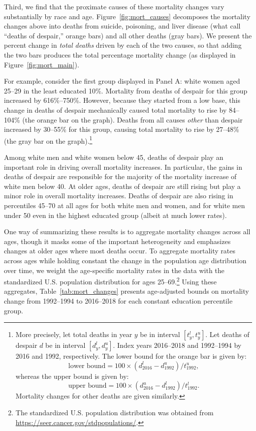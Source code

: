 \documentclass[12pt,letterpaper]{article}
\numberwithin{equation}{section}
\begin{document}
Third, we find that the proximate causes of these mortality changes vary substantially by race and age. Figure~\ref{fig:mort_causes} decomposes the mortality changes above into deaths from suicide, poisoning, and liver disease (what \citet{Case2017} call ``deaths of despair,'' orange bars) and all other deaths (gray bars). We present the percent change in \textit{total deaths} driven by each of the two causes, so that adding the two bars produces the total percentage mortality change (as displayed in Figure~\ref{fig:mort_main}).

For example, consider the first group displayed in Panel A: white women aged 25--29 in the least educated 10\%. Mortality from deaths of despair for this group increased by 616\%--750\%. However, because they started from a low base, this change in deaths of despair mechanically caused total mortality to rise by 84--104\% (the orange bar on the graph). Deaths from all causes \textit{other} than despair increased by 30--55\% for this group, causing total mortality to rise by 27--48\% (the gray bar on the graph).\footnote{More precisely, let total deaths in year $y$ be in interval $[t^l_y, t^u_y]$. Let deaths of despair $d$ be in interval $[d^l_y, d^u_y]$. Index years 2016--2018 and 1992--1994 by 2016 and 1992, respectively. The lower bound for the orange bar is given by:
$$ \text{lower bound} = 100 \times \left(d^l_{2016} - d^u_{1992} \right) / t^u_{1992},$$ whereas the upper bound is given by:
$$ \text{upper bound} = 100 \times \left(d^u_{2016} - d^l_{1992} \right) / t^l_{1992}.$$ Mortality changes for other deaths are given similarly.}

Among white men and white women below 45, deaths of despair play an important role in driving overall mortality increases. In particular, the gains in deaths of despair are responsible for the majority of the mortality increase of white men below 40. At older ages, deaths of despair are still rising but play a minor role in overall mortality increases. Deaths of despair are also rising in percentiles 45--70 at all ages for both white men and women, and for white men under 50 even in the highest educated group (albeit at much lower rates).

One way of summarizing these results is to aggregate mortality changes across all ages, though it masks some of the important heterogeneity and emphasizes changes at older ages where most deaths occur.  To aggregate mortality rates across ages while holding constant the change in the population age distribution over time, we weight the age-specific mortality rates in the data with the standardized U.S. population distribution for ages 25--69.\footnote{The standardized U.S. population distribution was obtained from \url{https://seer.cancer.gov/stdpopulations/}.} Using these aggregates, Table~\ref{tab:mort_changes} presents age-adjusted bounds on mortality change from 1992--1994 to 2016--2018 for each constant education percentile group.
\end{document}
